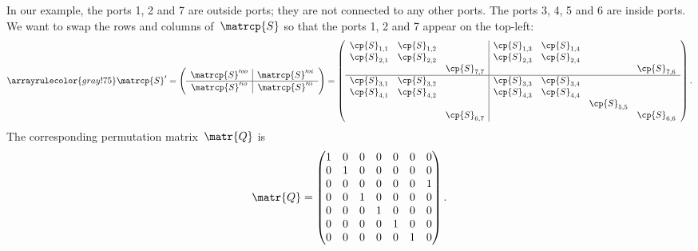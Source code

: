 \begin{refsection}
In our example, the ports 1, 2 and 7 are outside ports; they are not connected to any other ports.
The ports 3, 4, 5 and 6 are inside ports.
We want to swap the rows and columns of~$\matrcp{S}$ so that the ports 1, 2 and 7 appear on the top-left:
\begin{equation}
    \arrayrulecolor{gray!75}
    \matrcp{S}'
    =
    \left(
    \begin{array}{c|c}
        \matrcp{S}'^{oo} & \matrcp{S}'^{oi} \\
        \hline
        \matrcp{S}'^{io} & \matrcp{S}'^{ii} \\
    \end{array}
    \right)
    =
    \left(
    \begin{array}{ccc|cccc}
        \cp{S}_{1,1} & \cp{S}_{1,2} &              & \cp{S}_{1,3} & \cp{S}_{1,4} &              &              \\
        \cp{S}_{2,1} & \cp{S}_{2,2} &              & \cp{S}_{2,3} & \cp{S}_{2,4} &              &              \\
                     &              & \cp{S}_{7,7} &              &              &              & \cp{S}_{7,6} \\
        \hline
        \cp{S}_{3,1} & \cp{S}_{3,2} &              & \cp{S}_{3,3} & \cp{S}_{3,4} &              &              \\
        \cp{S}_{4,1} & \cp{S}_{4,2} &              & \cp{S}_{4,3} & \cp{S}_{4,4} &              &              \\
                     &              &              &              &              & \cp{S}_{5,5} &              \\
                     &              & \cp{S}_{6,7} &              &              &              & \cp{S}_{6,6} \\
    \end{array}
    \right)
    \text{.}
    \label{eq:implementation_4}
\end{equation}
The corresponding permutation matrix~$\matr{Q}$ is
\begin{equation}
    \matr{Q} =
    \begin{pmatrix}
        1  &  0  &  0  &  0  &  0  &  0  &  0  \\
        0  &  1  &  0  &  0  &  0  &  0  &  0  \\
        0  &  0  &  0  &  0  &  0  &  0  &  1  \\
        0  &  0  &  1  &  0  &  0  &  0  &  0  \\
        0  &  0  &  0  &  1  &  0  &  0  &  0  \\
        0  &  0  &  0  &  0  &  1  &  0  &  0  \\
        0  &  0  &  0  &  0  &  0  &  1  &  0  \\
    \end{pmatrix}
    \text{.}
    \label{eq:implementation_5}
\end{equation}



\end{refsection}
